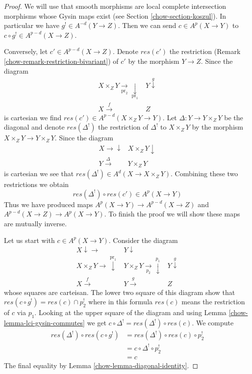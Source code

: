 \begin{proof}

We will use that smooth morphisms are local complete intersection
morphisms whose Gysin maps exist (see Section \ref{chow-section-koszul}).
In particular we have $g^! \in A^{-d}(Y \to Z)$. Then we can send
$c \in A^p(X \to Y)$ to $c \circ g^! \in A^{p - d}(X \to Z)$.

\medskip\noindent
Conversely, let $c' \in A^{p - d}(X \to Z)$. Denote $res(c')$ the restriction
(Remark \ref{chow-remark-restriction-bivariant}) of $c'$ by the morphism $Y \to Z$.
Since the diagram
$$
\begin{array}{cc}X \times_Z Y \underset{\text{pr}_2}{\longrightarrow}\underset{\text{pr}_1}{\downarrow} & Y \overset{g}{\downarrow} \\ X \overset{f}{\longrightarrow} & Z\end{array}
$$
is cartesian we find $res(c') \in A^{p - d}(X \times_Z Y \to Y)$.
Let $\Delta : Y \to Y \times_Z Y$ be the diagonal and denote
$res(\Delta^!)$ the restriction of $\Delta^!$
to $X \times_Z Y$ by the morphism $X \times_Z Y \to Y \times_Z Y$.
Since the diagram
$$
\begin{array}{cc}X \longrightarrow\downarrow & X \times_Z Y \downarrow \\ Y \overset{\Delta}{\longrightarrow} & Y \times_Z Y\end{array}
$$
is cartesian we see that $res(\Delta^!) \in A^d(X \to X \times_Z Y)$.
Combining these two restrictions we obtain
$$
res(\Delta^!) \circ res(c') \in A^p(X \to Y)
$$
Thus we have produced maps $A^p(X \to Y) \to A^{p - d}(X \to Z)$
and $A^{p - d}(X \to Z) \to A^p(X \to Y)$. To finish the proof we
will show these maps are mutually inverse.

\medskip\noindent
Let us start with $c \in A^p(X \to Y)$. Consider the diagram
$$
\begin{array}{ccc}X \downarrow\longrightarrow & Y \downarrow &  \\ X \times_Z Y \longrightarrow\overset{\text{pr}_1}{\downarrow} & Y \times_Z Y \underset{p_2}{\longrightarrow}\overset{p_1}{\downarrow} & Y \overset{g}{\downarrow} \\ X \overset{f}{\longrightarrow} & Y \overset{g}{\longrightarrow} & Z\end{array}
$$
whose squares are carteisan. The lower two square of this diagram
show that $res(c \circ g^!) = res(c) \cap p_2^!$ where in this formula
$res(c)$ means the restriction of $c$ via $p_1$. Looking at the upper
square of the diagram and using Lemma \ref{chow-lemma-lci-gysin-commutes}
we get $c \circ \Delta^! = res(\Delta^!) \circ res(c)$.
We compute
\begin{align*}
res(\Delta^!) \circ res(c \circ g^!)
& =
res(\Delta^!) \circ res(c) \circ p_2^! \\
& =
c \circ \Delta^! \circ p_2^! \\
& =
c
\end{align*}
The final equality by Lemma \ref{chow-lemma-diagonal-identity}.


\end{proof}
